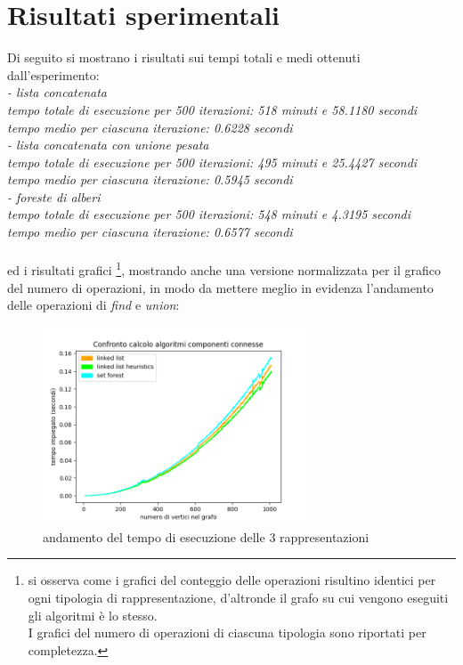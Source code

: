 \documentclass[12pt]{article}
\begin{document}
\section{Risultati sperimentali}
Di seguito si mostrano i risultati sui tempi totali e medi ottenuti dall'esperimento:\\
\textit{- lista concatenata\\
tempo totale di esecuzione per  500  iterazioni:  518  minuti e  58.1180  secondi\\
tempo medio per ciascuna iterazione:  0.6228 secondi\\
- lista concatenata con unione pesata\\
tempo totale di esecuzione per  500  iterazioni:  495  minuti e  25.4427  secondi\\
tempo medio per ciascuna iterazione:  0.5945 secondi\\
- foreste di alberi\\
tempo totale di esecuzione per  500  iterazioni:  548  minuti e  4.3195  secondi \\
tempo medio per ciascuna iterazione:  0.6577 secondi\\
}\\
ed i risultati grafici \footnote{si osserva come i grafici del conteggio delle operazioni risultino identici per ogni tipologia di rappresentazione, d'altronde il grafo su cui vengono eseguiti gli algoritmi è lo stesso.\\
I grafici del numero di operazioni di ciascuna tipologia sono riportati per completezza.}, mostrando anche una versione normalizzata per il grafico del numero di operazioni, in modo da mettere meglio in evidenza l'andamento delle operazioni di \textit{find} e \textit{union}:

    \begin{figure}[h]
        \centering
        \includegraphics[width=0.7\textwidth]{images/results/result.png}
        \caption{andamento del tempo di esecuzione delle 3 rappresentazioni}
        \label{fig:result}
    \end{figure}
\end{document}
